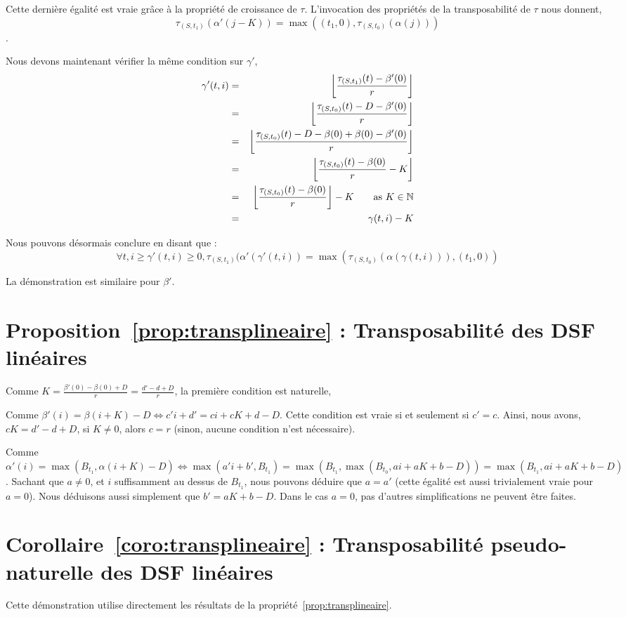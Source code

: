 Cette dernière égalité est vraie grâce à la propriété de croissance de $\tau$. L'invocation des propriétés de la transposabilité de $\tau$ nous donnent,
$$\tau_{(S,t_1)}(\alpha'(j-K)) = \max((t_1,0), \tau_{(S,t_0)}(\alpha(j)))$$.

Nous devons maintenant vérifier la même condition sur $\gamma'$,
\begin{eqnarray*}
\gamma'(t,i) &=& \left\lfloor\frac{\tau_{(S,t_1)}(t)-\beta'(0)}{r}\right\rfloor \\
&=& \left\lfloor\frac{\tau_{(S,t_0)}(t)-D-\beta'(0)}{r}\right\rfloor \\
& = & \left\lfloor\frac{\tau_{(S,t_0)}(t)-D-\beta(0)+\beta(0)-\beta'(0)}{r}\right\rfloor\\
& = & \left\lfloor\frac{\tau_{(S,t_0)}(t)-\beta(0)}{r}-K\right\rfloor\\
& = & \left\lfloor\frac{\tau_{(S,t_0)}(t)-\beta(0)}{r}\right\rfloor-K\qquad \textrm{as\ } K \in \mathbb{N}\\
& = & \gamma(t,i)-K
\end{eqnarray*}
 
Nous pouvons désormais conclure en disant que : $$\forall t,i \geq \gamma'(t,i) \geq 0, \tau_{(S,t_1)}(\alpha'(\gamma'(t,i)) = \max(\tau_{(S,t_0)}(\alpha(\gamma(t,i))),(t_1,0))$$

La démonstration est similaire pour $\beta'$.
\findemo

\section{Proposition~\ref{prop:transplineaire} : Transposabilité des DSF linéaires}
Comme $K = \frac{\beta'(0)-\beta(0)+D}{r} = \frac{d'-d+D}r$, la première condition est naturelle,

Comme $\beta'(i) = \beta(i+K)-D \Leftrightarrow c'i + d' = ci+cK+d-D$. Cette condition est vraie si et seulement si $c' = c$. Ainsi, nous avons, $cK = d'-d+D$, si $K\neq 0$, alors $c = r$ (sinon, aucune condition n'est nécessaire).

Comme $\alpha'(i) = \max(B_{t_1}, \alpha(i+K)-D) \Leftrightarrow \max(a'i+b',B_{t_1}) = \max(B_{t_1}, \max(B_{t_0}, ai+aK+b-D)) = \max(B_{t_1}, ai+aK+b-D)$. Sachant que $a\neq 0$, et $i$ suffisamment au dessus de $B_{t_1}$, nous pouvons déduire que $a=a'$ (cette égalité est aussi trivialement vraie pour $a=0$). Nous déduisons aussi simplement que $b' = aK+b-D$. Dans le cas $a=0$, pas d'autres simplifications ne peuvent être faites.
\findemo

\section{Corollaire~\ref{coro:transplineaire} : Transposabilité pseudo-naturelle des DSF linéaires}
Cette démonstration utilise directement les résultats de la propriété~\ref{prop:transplineaire}.

